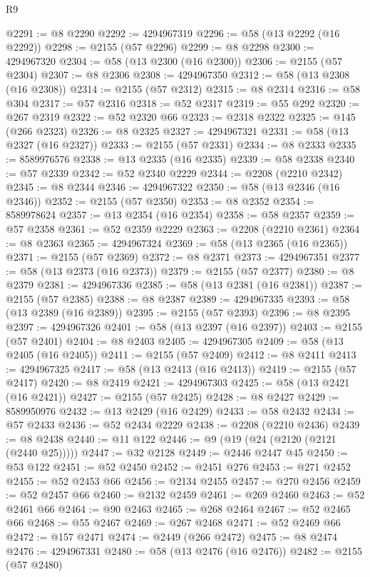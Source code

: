 \begin{lexlean}{R9}
\begin{coremodule}
@2291 := @8 @2290
@2292 := 4294967319
@2296 := @58 (@13 @2292 (@16 @2292))
@2298 := @2155 (@57 @2296)
@2299 := @8 @2298
@2300 := 4294967320
@2304 := @58 (@13 @2300 (@16 @2300))
@2306 := @2155 (@57 @2304)
@2307 := @8 @2306
@2308 := 4294967350
@2312 := @58 (@13 @2308 (@16 @2308))
@2314 := @2155 (@57 @2312)
@2315 := @8 @2314
@2316 := @58 @304
@2317 := @57 @2316
@2318 := @52 @2317
@2319 := @55 @292
@2320 := @267 @2319
@2322 := @52 @2320 @66
@2323 := @2318 @2322
@2325 := @145 (@266 @2323)
@2326 := @8 @2325
@2327 := 4294967321
@2331 := @58 (@13 @2327 (@16 @2327))
@2333 := @2155 (@57 @2331)
@2334 := @8 @2333
@2335 := 8589976576
@2338 := @13 @2335 (@16 @2335)
@2339 := @58 @2338
@2340 := @57 @2339
@2342 := @52 @2340 @2229
@2344 := @2208 (@2210 @2342)
@2345 := @8 @2344
@2346 := 4294967322
@2350 := @58 (@13 @2346 (@16 @2346))
@2352 := @2155 (@57 @2350)
@2353 := @8 @2352
@2354 := 8589978624
@2357 := @13 @2354 (@16 @2354)
@2358 := @58 @2357
@2359 := @57 @2358
@2361 := @52 @2359 @2229
@2363 := @2208 (@2210 @2361)
@2364 := @8 @2363
@2365 := 4294967324
@2369 := @58 (@13 @2365 (@16 @2365))
@2371 := @2155 (@57 @2369)
@2372 := @8 @2371
@2373 := 4294967351
@2377 := @58 (@13 @2373 (@16 @2373))
@2379 := @2155 (@57 @2377)
@2380 := @8 @2379
@2381 := 4294967336
@2385 := @58 (@13 @2381 (@16 @2381))
@2387 := @2155 (@57 @2385)
@2388 := @8 @2387
@2389 := 4294967335
@2393 := @58 (@13 @2389 (@16 @2389))
@2395 := @2155 (@57 @2393)
@2396 := @8 @2395
@2397 := 4294967326
@2401 := @58 (@13 @2397 (@16 @2397))
@2403 := @2155 (@57 @2401)
@2404 := @8 @2403
@2405 := 4294967305
@2409 := @58 (@13 @2405 (@16 @2405))
@2411 := @2155 (@57 @2409)
@2412 := @8 @2411
@2413 := 4294967325
@2417 := @58 (@13 @2413 (@16 @2413))
@2419 := @2155 (@57 @2417)
@2420 := @8 @2419
@2421 := 4294967303
@2425 := @58 (@13 @2421 (@16 @2421))
@2427 := @2155 (@57 @2425)
@2428 := @8 @2427
@2429 := 8589950976
@2432 := @13 @2429 (@16 @2429)
@2433 := @58 @2432
@2434 := @57 @2433
@2436 := @52 @2434 @2229
@2438 := @2208 (@2210 @2436)
@2439 := @8 @2438
@2440 := @11 @122
@2446 := @9 (@19 (@24 (@2120 (@2121 (@2440 @25)))))
@2447 := @32 @2128
@2449 := @2446 @2447 @45
@2450 := @53 @122
@2451 := @52 @2450
@2452 := @2451 @276
@2453 := @271 @2452
@2455 := @52 @2453 @66
@2456 := @2134 @2455
@2457 := @270 @2456
@2459 := @52 @2457 @66
@2460 := @2132 @2459
@2461 := @269 @2460
@2463 := @52 @2461 @66
@2464 := @90 @2463
@2465 := @268 @2464
@2467 := @52 @2465 @66
@2468 := @55 @2467
@2469 := @267 @2468
@2471 := @52 @2469 @66
@2472 := @157 @2471
@2474 := @2449 (@266 @2472)
@2475 := @8 @2474
@2476 := 4294967331
@2480 := @58 (@13 @2476 (@16 @2476))
@2482 := @2155 (@57 @2480)

\end{coremodule}
\end{lexlean}
